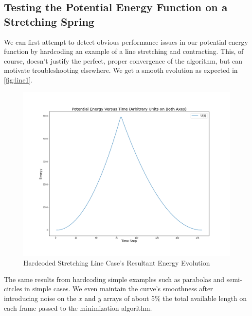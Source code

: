 \documentclass[epjST]{svjour}
\begin{document}
\subsection{Testing the Potential Energy Function on a Stretching Spring}
We can first attempt to detect obvious performance issues in our potential energy function by hardcoding an example of a line stretching and contracting. This, of course, doesn't justify the perfect, proper convergence of the algorithm, but can motivate troubleshooting elsewhere. We get a smooth evolution as expected in \autoref{fig:line1}.
\begin{figure}[h]
    \centering
    \includegraphics[width=0.8\linewidth]{figures/minimization1/noise_energy_time_plot.png}
    \caption{Hardcoded Stretching Line Case's Resultant Energy Evolution}
    \label{fig:line1}
\end{figure}
The same results from hardcoding simple examples such as parabolas and semi-circles in simple cases. We even maintain the curve's smoothness after introducing noise on the $x$ and $y$ arrays of about 5\% the total available length on each frame passed to the minimization algorithm.
\end{document}
